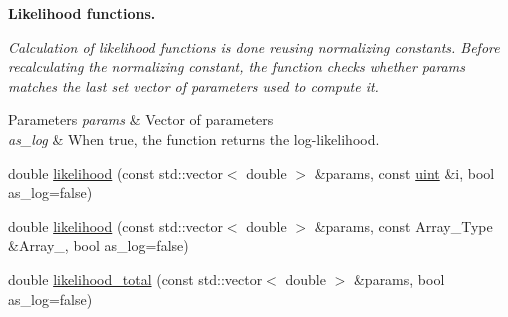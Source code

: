 \begin{Indent}\textbf{ Likelihood functions.}\par
{\em Calculation of likelihood functions is done reusing normalizing constants. Before recalculating the normalizing constant, the function checks whether {\ttfamily params} matches the last set vector of parameters used to compute it.


\begin{DoxyParams}{Parameters}
{\em params} & Vector of parameters \\
\hline
{\em as\+\_\+log} & When {\ttfamily true}, the function returns the log-\/likelihood. \\
\hline
\end{DoxyParams}
}\begin{DoxyCompactItemize}
\item 
double \hyperlink{class_model_ae75fe2213980b6b245e279c7836ab99b}{likelihood} (const std\+::vector$<$ double $>$ \&params, const \hyperlink{typedefs_8hpp_a91ad9478d81a7aaf2593e8d9c3d06a14}{uint} \&i, bool as\+\_\+log=false)
\item 
double \hyperlink{class_model_a1a11a54860e22fbd152de4d7cfd30b89}{likelihood} (const std\+::vector$<$ double $>$ \&params, const Array\+\_\+\+Type \&Array\+\_\+, bool as\+\_\+log=false)
\item 
double \hyperlink{class_model_a31d16ef478d772cedde0813575074a0f}{likelihood\+\_\+total} (const std\+::vector$<$ double $>$ \&params, bool as\+\_\+log=false)
\end{DoxyCompactItemize}
\end{Indent}
